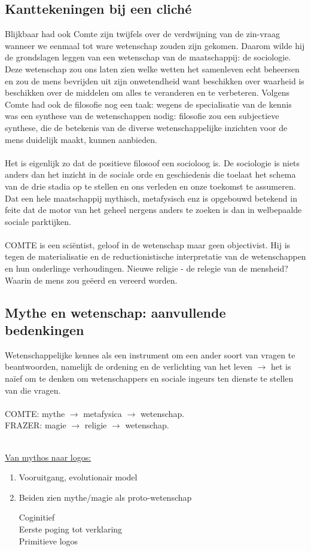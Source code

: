 \documentclass[11pt,a4paper]{article}
\begin{document}
\subsection{Kanttekeningen bij een clich\'e}
Blijkbaar had ook Comte zijn twijfels over de verdwijning van de zin-vraag wanneer we eenmaal tot ware wetenschap zouden zijn gekomen. Daarom wilde hij de grondslagen leggen van een wetenschap van de maatschappij: de sociologie. Deze wetenschap zou ons laten zien welke wetten het samenleven echt beheersen en zou de mens bevrijden uit zijn onwetendheid want beschikken over waarheid is beschikken over de middelen om alles te veranderen en te verbeteren.
Volgens Comte had ook de filosofie nog een taak: wegens de specialisatie van de kennis was een synthese van de wetenschappen nodig: filosofie zou een subjectieve synthese, die de betekenis van de diverse wetenschappelijke inzichten voor de mens duidelijk maakt, kunnen aanbieden.
\\
\\
Het is eigenlijk zo dat de positieve filosoof een socioloog is. De sociologie is niets anders dan het inzicht in de sociale orde en geschiedenis die toelaat het schema van de drie stadia op te stellen en ons verleden en onze toekomst te assumeren. Dat een hele maatschappij mythisch, metafysisch enz is opgebouwd betekend in feite dat de motor van het geheel nergens anders te zoeken is dan in welbepaalde sociale parktijken.
\\
\\
COMTE is een sci\"entist, geloof in de wetenschap maar geen objectivist. Hij is tegen de materialisatie en de reductionistische interpretatie van de wetenschappen en hun onderlinge verhoudingen. Nieuwe religie - de relegie van de mensheid? Waarin de mens zou ge\"eerd en vereerd worden.
\subsection{Mythe en wetenschap: aanvullende bedenkingen}
Wetenschappelijke kennes als een instrument om een ander soort van vragen te beantwoorden, namelijk de ordening en de verlichting van het leven $\rightarrow$ het is na\"ief om te denken om wetenschappers en sociale ingeurs ten dienste te stellen van die vragen.
\\
\\
COMTE: mythe $\longrightarrow$ metafysica $\longrightarrow$ wetenschap.
\\
FRAZER: magie $\longrightarrow$ religie $\longrightarrow$ wetenschap.
\\
\\
\begin{center}
\underline{Van mythos naar logos:}
\end{center}
\begin{enumerate}
\item Vooruitgang, evolutionair model
\item Beiden zien mythe/magie als proto-wetenschap
\begin{flushleft}
Coginitief\\
Eerste poging tot verklaring\\
Primitieve logos
\end{flushleft}
\end{enumerate}
\end{document}
